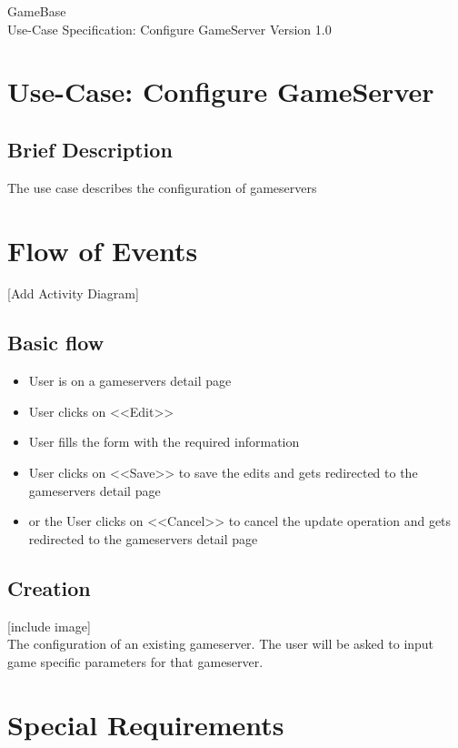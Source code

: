 \documentclass[a4paper,12pt,chapterprefix=false,bibliography=totoc,listof=totoc,]{scrreprt}
\begin{document}
\begin{flushright}
GameBase
\\
Use-Case Specification: Configure GameServer
\bigbreak
Version 1.0
\end{flushright}

\tableofcontents

\chapter{Use-Case: Configure GameServer}

\section{Brief Description}
The use case describes the configuration of gameservers

\chapter{Flow of Events}
[Add Activity Diagram]
\section{Basic flow}

\begin{itemize}
    \item User is on a gameservers detail page
    \item User clicks on <<Edit>>
    \item User fills the form with the required information
    \item User clicks on <<Save>> to save the edits and gets redirected to the gameservers detail page
    \item or the User clicks on <<Cancel>> to cancel the update operation and gets redirected to the gameservers detail page
\end{itemize}

\section{Creation}
[include image]\\
The configuration of an existing gameserver. The user will be asked to input game specific parameters for that gameserver.

\chapter{Special Requirements}
\end{document}
